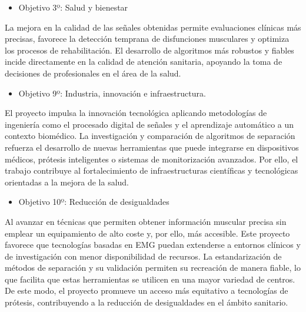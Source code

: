 \documentclass[12pt, a4paper]{article}
\begin{document}
\begin{itemize}
    \item Objetivo 3º: Salud y bienestar
\end{itemize}
La mejora en la calidad de las señales obtenidas permite evaluaciones clínicas más precisas, favorece la detección temprana de disfunciones musculares y optimiza los procesos de rehabilitación. El desarrollo de algoritmos más robustos y fiables incide directamente en la calidad de atención sanitaria, apoyando la toma de decisiones de profesionales en el área de la salud.
\begin{itemize}
    \item Objetivo 9º: Industria, innovación e infraestructura.
\end{itemize}
El proyecto impulsa la innovación tecnológica aplicando metodologías de ingeniería como el procesado digital de señales  y el aprendizaje automático a un contexto biomédico. La investigación y comparación de algoritmos de separación refuerza el desarrollo de nuevas herramientas que puede integrarse en dispositivos médicos, prótesis inteligentes o sistemas de monitorización avanzados. Por ello, el trabajo contribuye al fortalecimiento de infraestructuras científicas y tecnológicas orientadas a la mejora de la salud.
\begin{itemize}
    \item Objetivo 10º: Reducción de desigualdades
\end{itemize}
Al avanzar en técnicas que permiten obtener información muscular precisa sin emplear un equipamiento de alto coste y, por ello,  más accesible. Este proyecto favorece que tecnologías basadas en EMG puedan extenderse a entornos clínicos y de investigación con menor disponibilidad de recursos. La estandarización de métodos de separación y su validación permiten su recreación de manera fiable, lo que facilita que estas herramientas se utilicen en una mayor variedad de centros. De este modo, el proyecto promueve un acceso más equitativo a tecnologías de prótesis, contribuyendo a la reducción de desigualdades en el ámbito sanitario.
\clearpage
\end{document}
